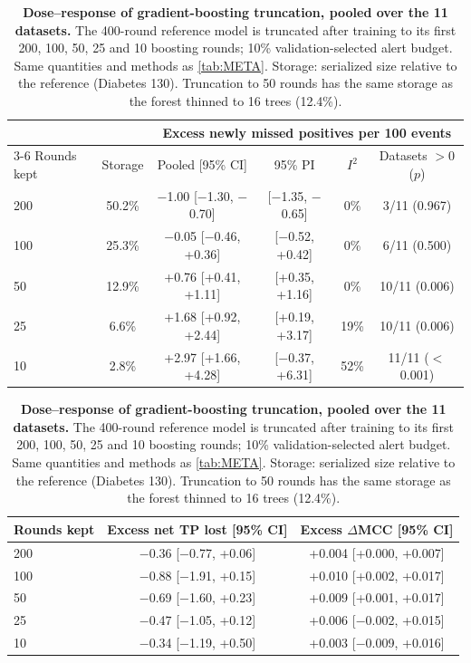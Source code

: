\begin{table}[!htb]
\centering
\caption{\textbf{Dose--response of gradient-boosting truncation, pooled over the 11 datasets.} The 400-round reference model is truncated after training to its first 200, 100, 50, 25 and 10 boosting rounds; 10\% validation-selected alert budget. Same quantities and methods as \autoref{tab:META}. Storage: serialized size relative to the reference (Diabetes 130). Truncation to 50 rounds has the same storage as the forest thinned to 16 trees (12.4\%).}
\label{tab:GBM-LEVELS}
{\small
\begin{tabular}{lccccc}
\toprule
 & & \multicolumn{4}{c}{Excess newly missed positives per 100 events} \\
\cmidrule(l){3-6}
\rowcolor{white}Rounds kept & Storage & Pooled [95\% CI] & 95\% PI & $I^2$ & Datasets $>0$ ($p$) \\
\midrule
200 & 50.2\% & $-$1.00 [$-$1.30, $-$0.70] & [$-$1.35, $-$0.65] & 0\% & 3/11 (0.967) \\
100 & 25.3\% & $-$0.05 [$-$0.46, +0.36] & [$-$0.52, +0.42] & 0\% & 6/11 (0.500) \\
50 & 12.9\% & +0.76 [+0.41, +1.11] & [+0.35, +1.16] & 0\% & 10/11 (0.006) \\
25 & 6.6\% & +1.68 [+0.92, +2.44] & [+0.19, +3.17] & 19\% & 10/11 (0.006) \\
10 & 2.8\% & +2.97 [+1.66, +4.28] & [$-$0.37, +6.31] & 52\% & 11/11 ($<$0.001) \\
\bottomrule
\end{tabular}
\par\vspace{1.2em}
\begin{tabular}{lcc}
\toprule
Rounds kept & Excess net TP lost [95\% CI] & Excess $\Delta$MCC [95\% CI] \\
\midrule
200 & $-$0.36 [$-$0.77, +0.06] & +0.004 [+0.000, +0.007] \\
100 & $-$0.88 [$-$1.91, +0.15] & +0.010 [+0.002, +0.017] \\
50 & $-$0.69 [$-$1.60, +0.23] & +0.009 [+0.001, +0.017] \\
25 & $-$0.47 [$-$1.05, +0.12] & +0.006 [$-$0.002, +0.015] \\
10 & $-$0.34 [$-$1.19, +0.50] & +0.003 [$-$0.009, +0.016] \\
\bottomrule
\end{tabular}
}
\end{table}
